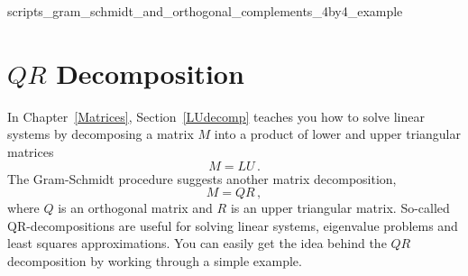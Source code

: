  {scripts_gram_schmidt_and_orthogonal_complements_4by4_example}

\section{$QR$ Decomposition}
In Chapter~\ref{Matrices}, Section~\ref{LUdecomp} teaches you how to solve linear systems by decomposing a matrix $M$ into 
a product of lower and upper triangular matrices
\[M=LU\, .\]
The Gram-Schmidt procedure suggests another matrix decomposition,
\[M=QR\, ,\] 
where $Q$ is an orthogonal matrix and $R$ is an upper triangular matrix. So-called QR-decompositions
are useful for solving linear systems, eigenvalue problems and least squares approximations. You can
easily get the idea behind the $QR$ decomposition by working through a simple example.

